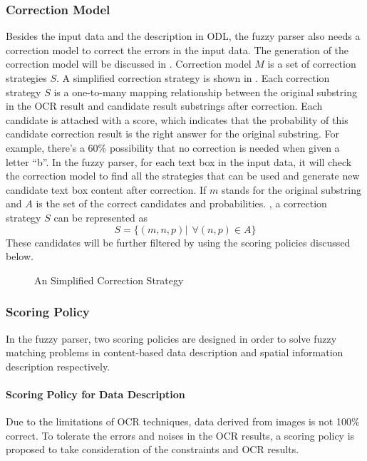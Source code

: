 \subsubsection{Correction Model}
\label{sec:corrmodel}
Besides the input data and the description in ODL, the fuzzy parser
also needs a correction model to correct the errors in the input data.
The generation of the correction model will be discussed in
. Correction model $M$ is a set of correction
strategies $S$.
A simplified correction strategy is shown in .
Each correction strategy $S$ is a one-to-many mapping relationship between
the original substring in the OCR result and candidate result substrings
after correction. Each candidate is attached with a score,
which indicates that the probability of this candidate correction result is
the right answer for the original substring. For example, there's a 60\%
possibility that no correction is needed when given a letter ``b''.
In the fuzzy parser, for each text box in the input data, it will check
the correction model to find all the strategies that can be used
and generate new candidate text box content after correction.
If $m$ stands for the original substring and $A$ is the
set of the correct candidates and probabilities.
, a correction strategy $S$ can be represented as
\begin{equation}
S=\{(m, n, p)|~~\forall (n, p) \in A\}
\end{equation}
These candidates will be further filtered by using the scoring policies
discussed below.
\begin{figure}
\centering
{}
\caption{An Simplified Correction Strategy}
\label{fig:corrstrategy}
\end{figure}

\subsubsection{Scoring Policy}
\label{sec:score}
In the fuzzy parser, two scoring policies are designed
in order to solve fuzzy matching
problems in content-based data description and spatial information description respectively.

\paragraph{Scoring Policy for Data Description}
Due to the limitations of OCR techniques, data derived from images is not 100\%
correct. To tolerate the errors and noises in the OCR results, a scoring
policy is proposed to take consideration of the constraints and OCR results.

